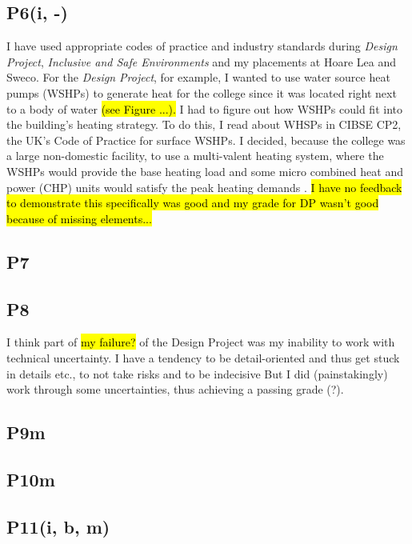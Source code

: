 \subsection*{P6(i, -)}

I have used appropriate codes of practice and industry standards during \textit{Design Project}, \textit{Inclusive and Safe Environments} and my placements at Hoare Lea and Sweco.
For the \textit{Design Project}, for example, I wanted to use water source heat pumps (WSHPs) to generate heat for the college since it was located right next to a body of water \hl{(see Figure ...).}
I had to figure out how WSHPs could fit into the building's heating strategy.
To do this, I read about WHSPs in CIBSE CP2, the UK's Code of Practice for surface WSHPs.
I decided, because the college was a large non-domestic facility, to use a multi-valent heating system, where the WSHPs would provide the base heating load and some micro combined heat and power (CHP) units would satisfy the peak heating demands \citep[pp.~12,~38]{CP22016}.
\hl{I have no feedback to demonstrate this specifically was good and my grade for DP wasn't good because of missing elements...}


\subsection*{P7}


\subsection*{P8}

I think part of \hl{my failure?} of the Design Project was my inability to work with technical uncertainty.
I have a tendency to be detail-oriented and thus get stuck in details etc., to not take risks and to be indecisive
But I did (painstakingly) work through some uncertainties, thus achieving a passing grade (?).


\subsection*{P9m}


\subsection*{P10m}


\subsection*{P11(i, b, m)}


